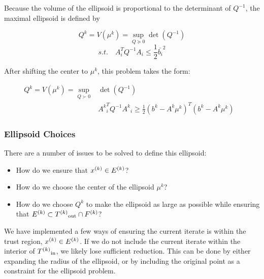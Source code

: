 Because the volume of the ellipsoid is proportional to the determinant of $Q^{-1}$, the maximal ellipsoid is defined by

\[
Q^k = V(\mu^k) = \sup_{Q \succeq 0} \det(Q^{-1})
\]
\[
s.t. \quad A_i^T Q^{-1} A_i \le \frac 1 2 \bar{b_i}^2
\]



After shifting the center to $\mu^{k}$, this problem takes the form:

\begin{center}
\begin{align}
\label{ellipse_1}
Q^k = V(\mu^k) = \sup_{Q \succ 0} & \det(Q^{-1}) & \\
  & {A^k}_i^T Q^{-1} {A^k}_i \ge \frac 1 2 (b^k - A^k\mu^{k})^T(b^k - A^k \mu^{k}) & \nonumber
\end{align}
\end{center}



%


\subsubsection{Ellipsoid Choices}

There are a number of issues to be solved to define this ellipsoid:
\begin{itemize}
\item How do we ensure that ${x}^{(k)} \in {E^{(k)}}$?
\item How do we choose the center of the ellipsoid $\mu^k$?
\item How do we choose $Q^{k}$ to make the  ellipsoid as large as possible while ensuring that $ {E^{(k)}} \subset {T^{(k)}}_{\text{out}} \cap {F}^{(k)}$?
\end{itemize}

We have implemented a few ways of ensuring the current iterate is within the trust region, ${x}^{(k)} \in {E^{(k)}}$.
If we do not include the current iterate within the interior of ${T^{(k)}}_{\text{in}}$, we likely lose sufficient reduction.
This can be done by either expanding the radius of the ellipsoid, or by including the original point as a constraint for the ellipsoid problem.

